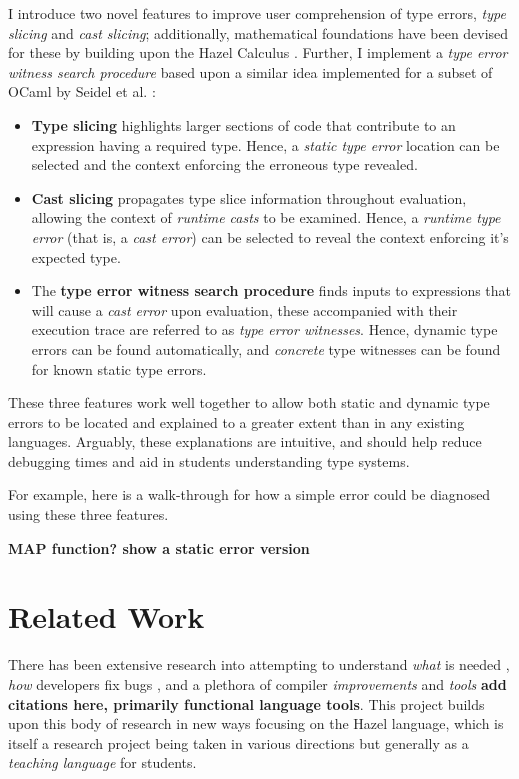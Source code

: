 I introduce two novel features to improve user comprehension of type errors, \textit{type slicing} and \textit{cast slicing}; additionally, mathematical foundations have been devised for these by building upon the Hazel Calculus \cite{HazelLivePaper}. Further, I implement a \textit{type error witness search procedure} based upon a similar idea implemented for a subset of OCaml by Seidel et al. \cite{SearchProc}:
\begin{itemize}
\item \textbf{Type slicing} highlights larger sections of code that contribute to an expression having a required type. Hence, a \textit{static type error} location can be selected and the context enforcing the erroneous type revealed.

\item \textbf{Cast slicing} propagates type slice information throughout evaluation, allowing the context of \textit{runtime casts} to be examined. Hence, a \textit{runtime type error} (that is, a \textit{cast error}) can be selected to reveal the context enforcing it's expected type.

\item The \textbf{type error witness search procedure} finds inputs to expressions that will cause a \textit{cast error} upon evaluation, these accompanied with their execution trace are referred to as \textit{type error witnesses}. Hence, dynamic type errors can be found automatically, and \textit{concrete} type witnesses can be found for known static type errors.
\end{itemize}

These three features work well together to allow both static and dynamic type errors to be located and explained to a greater extent than in any existing languages. Arguably, these explanations are intuitive, and should help reduce debugging times and aid in students understanding type systems.

For example, here is a walk-through for how a simple error could be diagnosed using these three features. 

\textbf{MAP function? show a static error version}

\section{Related Work}
There has been extensive research into attempting to understand \textit{what} is needed \cite{DebugNeeds}, \textit{how} developers fix bugs \cite{HowFixBugs}, and a plethora of compiler \textit{improvements} and \textit{tools} \textbf{add citations here, primarily functional language tools}. This project builds upon this body of research in new ways focusing on the Hazel language, which is itself a research project being taken in various directions but generally as a \textit{teaching language} for students. 

